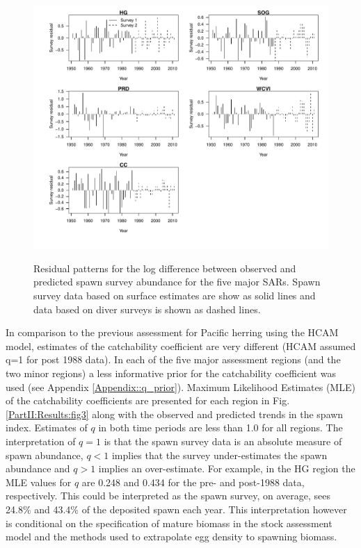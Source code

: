 \begin{figure}[!tbp]
	\includegraphics[width=\textwidth]{../FIGS/qPriorFigs/iscam_fig_surveyresid.pdf}\\
	\caption{Residual patterns for the log difference between observed and predicted spawn survey abundance for the five major SARs. Spawn survey data based on surface estimates are show as solid lines and data based on diver surveys is shown as dashed lines.}\label{PartII:Results:fig2}
\end{figure}

In comparison to the previous assessment for Pacific herring using the HCAM model, estimates of the catchability coefficient are very different (HCAM assumed q=1 for post 1988 data).  In each of the five major assessment regions (and the two minor regions) a less informative prior for the catchability coefficient was used (see Appendix \ref{Appendix::q_prior}).  Maximum Likelihood Estimates (MLE) of the catchability coefficients are presented for each region in Fig. \ref{PartII:Results:fig3} along with the observed and predicted trends in the spawn index.  Estimates of $q$ in both time periods are less than 1.0 for all regions.  The interpretation of $q=1$ is that the spawn survey data is an absolute measure of spawn abundance, $q<1$ implies that the survey under-estimates the spawn abundance and $q>1$ implies an over-estimate.  For example, in the HG region the MLE values for $q$ are 0.248 and 0.434 for the pre- and post-1988 data, respectively. This could be interpreted as the spawn survey, on average, sees 24.8\% and 43.4\% of the deposited spawn each year.  This interpretation however is conditional on the specification of mature biomass in the stock assessment model and the methods used to extrapolate egg density to spawning biomass. 

